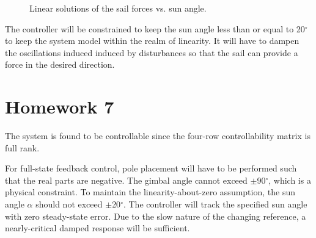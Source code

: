\documentclass[]{aiaa-tc}%
\begin{document}
	\begin{figure}[H]
		\centering
		\caption{Linear solutions of the sail forces vs. sun angle. }
		\label{fig:Force_linearity}
	\end{figure}	

	\vspace{5 mm}

	The controller will be constrained to keep the sun angle less than or equal to 20$^{\circ}$ to keep the system model within the realm of linearity. It will have to dampen the oscillations induced induced by disturbances so that the sail can provide a force in the desired direction. 

	\vspace{5 mm}
	\section{Homework 7}

	The system is found to be controllable since the four-row controllability matrix is full rank.

	\vspace{5 mm}

	For full-state feedback control, pole placement will have to be performed such that the real parts are negative. The gimbal angle cannot exceed $\pm$90$^{\circ}$, which is a physical constraint. To maintain the linearity-about-zero assumption, the sun angle $\alpha$ should not exceed $\pm$20$^{\circ}$. The controller will track the specified sun angle with zero steady-state error.  Due to the slow nature of the changing reference, a nearly-critical damped response will be sufficient.
\end{document}
